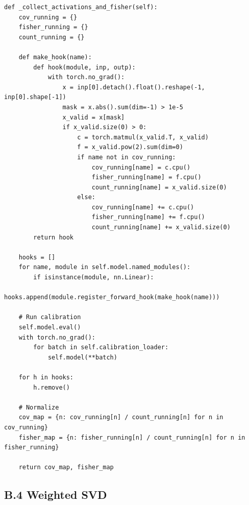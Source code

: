 \begin{lstlisting}
def _collect_activations_and_fisher(self):
    cov_running = {}
    fisher_running = {}
    count_running = {}
    
    def make_hook(name):
        def hook(module, inp, outp):
            with torch.no_grad():
                x = inp[0].detach().float().reshape(-1, inp[0].shape[-1])
                mask = x.abs().sum(dim=-1) > 1e-5
                x_valid = x[mask]
                if x_valid.size(0) > 0:
                    c = torch.matmul(x_valid.T, x_valid)
                    f = x_valid.pow(2).sum(dim=0)
                    if name not in cov_running:
                        cov_running[name] = c.cpu()
                        fisher_running[name] = f.cpu()
                        count_running[name] = x_valid.size(0)
                    else:
                        cov_running[name] += c.cpu()
                        fisher_running[name] += f.cpu()
                        count_running[name] += x_valid.size(0)
        return hook
    
    hooks = []
    for name, module in self.model.named_modules():
        if isinstance(module, nn.Linear):
            hooks.append(module.register_forward_hook(make_hook(name)))
    
    # Run calibration
    self.model.eval()
    with torch.no_grad():
        for batch in self.calibration_loader:
            self.model(**batch)
    
    for h in hooks:
        h.remove()
    
    # Normalize
    cov_map = {n: cov_running[n] / count_running[n] for n in cov_running}
    fisher_map = {n: fisher_running[n] / count_running[n] for n in fisher_running}
    
    return cov_map, fisher_map
\end{lstlisting}

\subsection{B.4 Weighted SVD}

